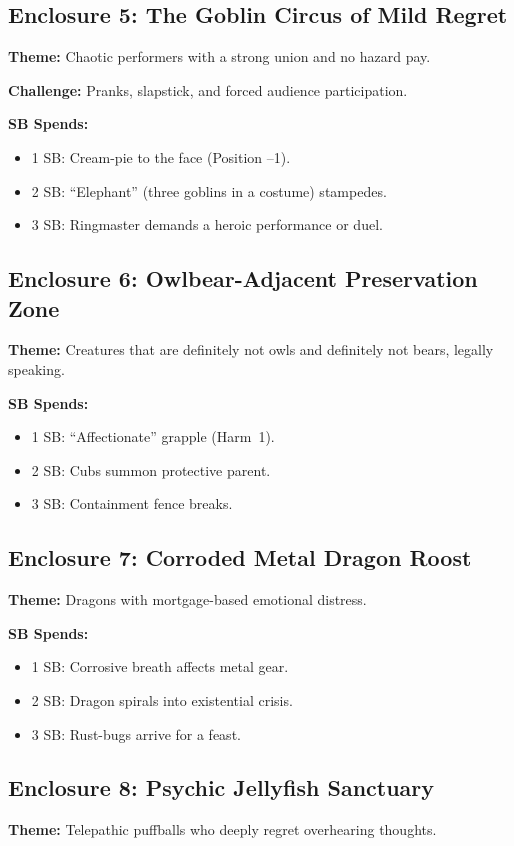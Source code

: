 \subsection{Enclosure 5: The Goblin Circus of Mild Regret}
\textbf{Theme:} Chaotic performers with a strong union and no hazard pay.

\textbf{Challenge:} Pranks, slapstick, and forced audience participation.

\textbf{SB Spends:}
\begin{itemize}
  \item 1 SB: Cream-pie to the face (Position --1).
  \item 2 SB: ``Elephant'' (three goblins in a costume) stampedes.
  \item 3 SB: Ringmaster demands a heroic performance or duel.
\end{itemize}

\subsection{Enclosure 6: Owlbear-Adjacent Preservation Zone}
\textbf{Theme:} Creatures that are definitely not owls and definitely not bears, legally speaking.

\textbf{SB Spends:}
\begin{itemize}
  \item 1 SB: ``Affectionate'' grapple (Harm~1).
  \item 2 SB: Cubs summon protective parent.
  \item 3 SB: Containment fence breaks.
\end{itemize}

\subsection{Enclosure 7: Corroded Metal Dragon Roost}
\textbf{Theme:} Dragons with mortgage-based emotional distress.

\textbf{SB Spends:}
\begin{itemize}
  \item 1 SB: Corrosive breath affects metal gear.
  \item 2 SB: Dragon spirals into existential crisis.
  \item 3 SB: Rust-bugs arrive for a feast.
\end{itemize}

\subsection{Enclosure 8: Psychic Jellyfish Sanctuary}
\textbf{Theme:} Telepathic puffballs who deeply regret overhearing thoughts.

